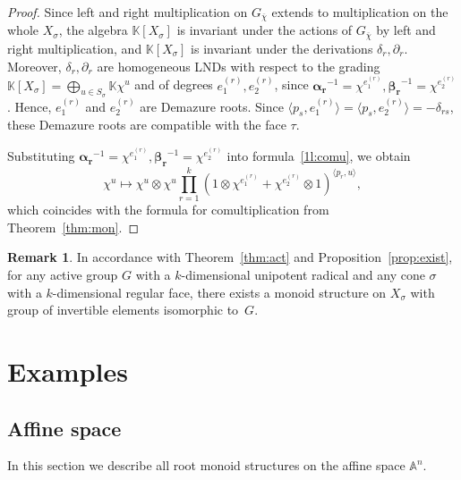 \documentclass[a4paper, 11pt]{amsart}
\theoremstyle{plain}
\theoremstyle{remark}
\theoremstyle{definition}
\newtheorem{remark}[theorem]{Remark}
\newcommand{\KK}{\mathbb{K}}
\newcommand{\GG}{G_{\overline{\chi}}}
\newcommand{\Alp}[1]{\pmb{\alpha_{#1}}}
\newcommand{\Bet}[1]{\pmb{\beta_{#1}}}
\begin{document}
\begin{proof}
	Since left and right multiplication on $\GG$ extends to multiplication on the whole $X_\sigma$, the algebra $\KK[X_\sigma]$ is invariant under the actions of $\GG$ by left and right multiplication, and $\KK[X_\sigma]$ is invariant under the derivations $\delta_{r}, \partial_{r}$. Moreover, $\delta_{r}, \partial_{r}$ are homogeneous LNDs with respect to the grading $\KK[X_\sigma] = \bigoplus_{u \in S_\sigma} \KK \chi^u$ and of degrees $e_1^{(r)}, e_2^{(r)}$, since $\Alp{r}^{-1} = \chi^{e_1^{(r)}}, \Bet{r}^{-1} = \chi^{e_2^{(r)}}$. Hence, $e_1^{(r)}$ and $e_2^{(r)}$ are Demazure roots. Since ${\langle p_s, e_1^{(r)} \rangle = \langle p_s, e_2^{(r)} \rangle = -\delta_{rs}}$, these Demazure roots are compatible with the face $\tau$.
	
	Substituting $\Alp{r}^{-1} = \chi^{e_1^{(r)}}, \Bet{r}^{-1} = \chi^{e_2^{(r)}}$ into formula~\eqref{1l:comu}, we obtain 
	\begin{equation}\label{form}
		\chi^u \mapsto \chi^u \otimes  \chi^u  \prod_{r = 1}^{k} (1 \otimes \chi^{e_1^{(r)}}  + \chi^{e_2^{(r)}} \otimes 1)^{\langle p_r, u\rangle},
	\end{equation}
	which coincides with the formula for comultiplication from Theorem~\ref{thm:mon}.
\end{proof}

\begin{remark}
	In accordance with Theorem~\ref{thm:act} and Proposition~\ref{prop:exist}, for any active group $G$ with a $k$-dimensional unipotent radical and any cone $\sigma$ with a $k$-dimensional regular face, there exists a monoid structure on $X_\sigma$ with group of invertible elements isomorphic to~$G$.
\end{remark}

\section{Examples}\label{sec:ex}
\subsection{Affine space}

In this section we describe all root monoid structures on the affine space $\mathbb{A}^n$.
\end{document}

